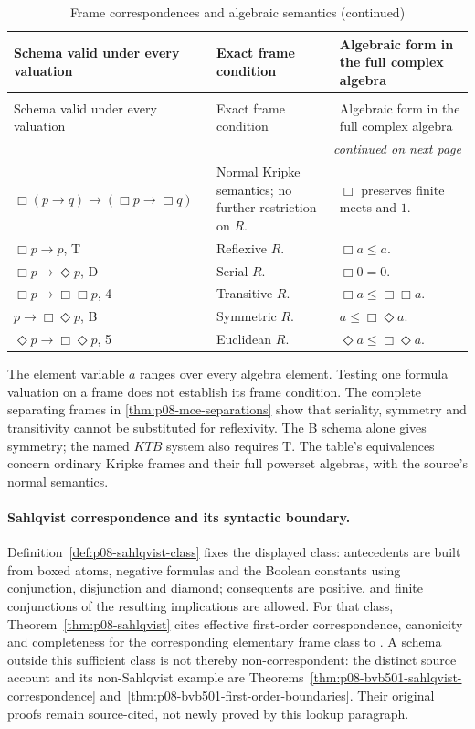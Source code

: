 \begin{longtable}{@{}p{}p{}p{}@{}}
\caption{Frame correspondences and algebraic semantics}\\
\toprule
Schema valid under every valuation & Exact frame condition & Algebraic form in the full complex algebra \\
\midrule
\endfirsthead
\caption[]{Frame correspondences and algebraic semantics (continued)}\\
\toprule
Schema valid under every valuation & Exact frame condition & Algebraic form in the full complex algebra \\
\midrule
\endhead
\midrule\multicolumn{3}{r}{\emph{continued on next page}}\\
\endfoot
\endlastfoot
\(\Box(p\to q)\to(\Box p\to\Box q)\) &
Normal Kripke semantics; no further restriction on \(R\). &
\(\Box\) preserves finite meets and \(1\). \\
\(\Box p\to p\), T & Reflexive \(R\). & \(\Box a\leq a\). \\
\(\Box p\to\Diamond p\), D & Serial \(R\). & \(\Box0=0\). \\
\(\Box p\to\Box\Box p\), 4 & Transitive \(R\). &
\(\Box a\leq\Box\Box a\). \\
\(p\to\Box\Diamond p\), B & Symmetric \(R\). &
\(a\leq\Box\Diamond a\). \\
\(\Diamond p\to\Box\Diamond p\), 5 & Euclidean \(R\). &
\(\Diamond a\leq\Box\Diamond a\). \\
\bottomrule
\end{longtable}

The element variable \(a\) ranges over every algebra element. Testing
one formula valuation on a frame does not establish its frame condition.
The complete separating frames in \cref{thm:p08-mce-separations}
show that seriality, symmetry and transitivity cannot be substituted for
reflexivity. The B schema alone gives symmetry; the named \(KTB\) system
also requires T. The table's equivalences concern ordinary Kripke frames
and their full powerset algebras, with the source's normal semantics.

\paragraph{Sahlqvist correspondence and its syntactic boundary.}
Definition~\ref{def:p08-sahlqvist-class} fixes the displayed class:
antecedents are built from boxed atoms, negative formulas and the Boolean
constants using conjunction, disjunction and diamond; consequents are
positive, and finite conjunctions of the resulting implications are allowed.
For that class, Theorem~\ref{thm:p08-sahlqvist} cites effective first-order
correspondence, canonicity and completeness for the corresponding elementary
frame class to \cite{Sahlqvist1975}.  A schema outside this sufficient class
is not thereby non-correspondent: the distinct source account and its
non-Sahlqvist example are
Theorems~\ref{thm:p08-bvb501-sahlqvist-correspondence}
and~\ref{thm:p08-bvb501-first-order-boundaries}.  Their original proofs
remain source-cited, not newly proved by this lookup paragraph.

